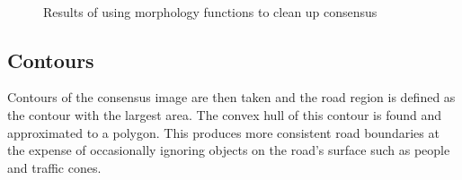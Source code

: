 \documentclass[10pt]{article}
\begin{document}
    \begin{figure}[!h]
        \centering
        \hfill
        \\
        \hfill
        \caption{Results of using morphology functions to clean up consensus}
    \end{figure}

\subsection *{Contours}
    Contours of the consensus image are then taken and the road region is defined as the contour with the largest area. The convex hull of this contour is found and approximated to a polygon. This produces more consistent road boundaries at the expense of occasionally ignoring objects on the road's surface such as people and traffic cones.
\end{document}
